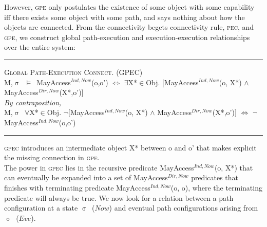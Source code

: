 \documentclass[a4paper,11pt, twoside,twocolumn]{article}
\newenvironment{logic}[1][null]
{\begin{flushleft} \small \label{#1}}
{\end{flushleft}}
\newcommand{\loin}{$\in$}
\newcommand{\loforall}{$\forall$}
\newcommand{\loexists}{$\exists$}
\newcommand{\loand}{$\land$}
\newcommand{\losigma}{$\upsigma$}
\newcommand{\loturns} {$\vDash$}
\newcommand{\loiff} {$\iff$}
\newcommand{\loneg}{$\boldsymbol \neg$}
\newcommand{\ablock} {\null\qquad}
\begin{document}
However, \textsc{gpe} only postulates the existence of some object with some capability iff there exists some object with some path, and says nothing about how the objects are connected. From the connectivity begets connectivity rule, \textsc{pec}, and \textsc{gpe}, we construct global path-execution and execution-execution relationships over the entire system:
\begin{logic}
\hrule\null
\textsc{\normalsize *Global Path-Execution Connect. (GPEC)}\\
M,\losigma\ \loturns\ MayAccess$^{Ind,Now}$(o,o')\linebreak
\ablock \loiff\linebreak
\ablock \loexists X*\loin{Obj}. $[$MayAccess$^{Ind,Now}$(o, X*) \loand\linebreak
\ablock \ablock \ablock \quad MayAccess$^{Dir,Now}$(X*,o')$]$
\linebreak\\
\textit{By contraposition,} \\
M,\losigma\ \loforall X*\loin{Obj}. \loneg $[$MayAccess$^{Ind,Now}$(o, X*) \loand\linebreak
\ablock \ablock \ablock \ablock MayAccess$^{Dir,Now}$(X*,o')$]$\linebreak
\ablock \loiff\linebreak
\ablock \loneg MayAccess$^{Ind,Now}$(o,o')\linebreak
\hrule
\end{logic}
\textsc{gpec} introduces an intermediate object X* between o and o' that makes explicit the missing connection in \textsc{gpe}.\\
The power in \textsc{gpec} lies in the recursive predicate MayAccess$^{Ind,Now}$(o, X*) that can eventually be expanded into a set of MayAccess$^{Dir,Now}$ predicates that finishes with terminating predicate MayAccess$^{Ind,Now}$(o, o), where the terminating predicate will always be true.
We now look for a relation between a path configuration at a state \losigma\ ($Now$) and eventual path configurations arising from \losigma\ ($Eve$).
\end{document}
